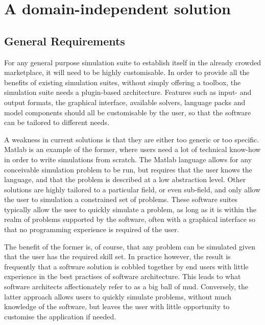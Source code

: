 \documentclass[\rootfolder/main.tex]{subfiles}
\begin{document}
\chapter{A domain-independent solution} %

\label{Chapter05} %

\section{General Requirements}

For any general purpose simulation suite to establish itself in the already crowded marketplace, it will need to be highly customisable.
In order to provide all the benefits of existing simulation suites, without simply offering a toolbox, the simulation suite needs a plugin-based architecture.
Features such as input- and output formats, the graphical interface, available solvers, language packs and model components should all be customisable by the user,
so that the software can be tailored to different needs.

A weakness in current solutions is that they are either too generic or too specific.
Matlab is an example of the former, where users need a lot of technical know-how in order to write simulations from scratch.
The Matlab language allows for any conceivable simulation problem to be run, but requires that the user knows the language,
and that the problem is described at a low abstraction level.
Other solutions are highly tailored to a particular field, or even sub-field, and only allow the user to simulation a constrained set of problems.
These software suites typically allow the user to quickly simulate a problem, as long as it is within the realm of problems supported by the software,
often with a graphical interface so that no programming experience is required of the user.

The benefit of the former is, of course, that any problem can be simulated given that the user has the required skill set.
In practice however, the result is frequently that a software solution is cobbled together by end users with little experience in the best practises of software architecture.
This leads to what software architects affectionately refer to as a big ball of mud.
Conversely, the latter approach allows users to quickly simulate problems, without much knowledge of the software, but leaves the user with little opportunity to customise the application if needed.
\end{document}
